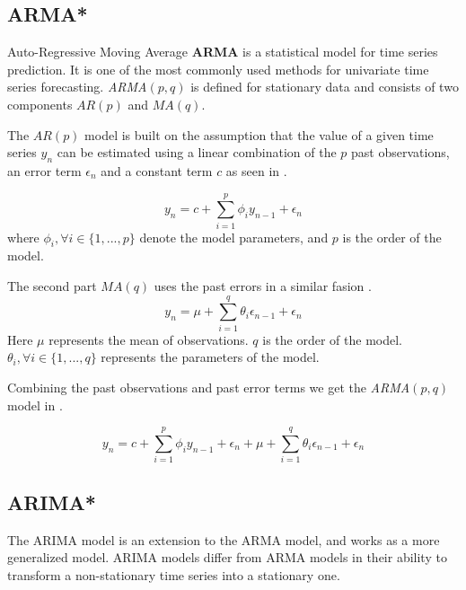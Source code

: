 
\subsection{ARMA*}

Auto-Regressive Moving Average \textbf{ARMA} is a statistical model for time series prediction.
It is one of the most commonly used methods for univariate time series forecasting.
\textit{ARMA}$(p, q)$ is defined for stationary data and consists of two components $AR(p)$ and $MA(q)$.

The $AR(p)$ model is built on the assumption that the value of a given time series $y_n$ can be estimated using a linear combination
of the $p$ past observations, an error term $\epsilon_n$ and a constant term $c$ as seen in  \citep{Box2016}.

\begin{equation}
  \label{eq:arma_ar(p)}
  y_n = c + \sum_{i=1}^{p} \phi_i y_{n-1} + \epsilon_n
\end{equation}
where $\phi_i, \forall i \in \{1, ..., p\} $ denote the model parameters, and $p$ is the order of the model.

The second part $MA(q)$ uses the past errors in a similar fasion .
\begin{equation}
  \label{eq_arma_ma(q)}
  y_n = \mu + \sum_{i=1}^{q} \theta_i \epsilon_{n-1} + \epsilon_n
\end{equation}
Here $\mu$ represents the mean of observations. $q$ is the order of the model. $\theta_i, \forall i \in \{1, ..., q\}$ represents the parameters of the model.

Combining the past observations  and past error terms  we get the \textit{ARMA}$(p,q)$ model in .

\begin{equation}
  \label{eq:arma}
  y_n = c + \sum_{i=1}^{p} \phi_i y_{n-1} + \epsilon_n + \mu + \sum_{i=1}^{q} \theta_i \epsilon_{n-1} + \epsilon_n
\end{equation}


\subsection{ARIMA*}
The ARIMA model is an extension to the ARMA model, and works as a more generalized model.
ARIMA models differ from ARMA models in their ability to transform a non-stationary time series into a stationary one.

